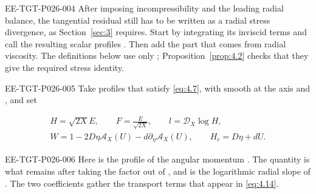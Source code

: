 \begin{EESegment}{EE-TGT-P026-004}
After imposing incompressibility and the leading radial balance, the
tangential residual still has to be written as a radial stress divergence,
as Section~\ref{sec:3} requires. Start by integrating its inviscid terms and
call the resulting scalar profiles . Then add
the part that comes from radial viscosity. The definitions below use only
; Proposition~\ref{prop:4.2} checks that they
give the required stress identity.
\end{EESegment}

\begin{EESegment}{EE-TGT-P026-005}
Take profiles that satisfy \eqref{eq:4.7}, with
 smooth at the axis and
, and set
\end{EESegment}
\begin{equation}
\begin{gathered}
 H=\sqrt{2X}E,\qquad F=\frac{E}{\sqrt{2X}},\qquad l=\mathcal D_X\log H,\\
 W=1-2D\eta\mathcal A_X(U)-d\partial_\eta\mathcal A_X(U),
 \qquad H_c=D\eta+dU.
\end{gathered}
\tag{4.8}\label{eq:4.8}
\end{equation}
\begin{EESegment}{EE-TGT-P026-006}
Here  is the profile of the angular momentum
. The quantity
 is what remains after taking the factor
 out of
, and  is the logarithmic radial
slope of . The two coefficients
 gather the transport terms that appear in
\eqref{eq:4.14}.
\end{EESegment}

